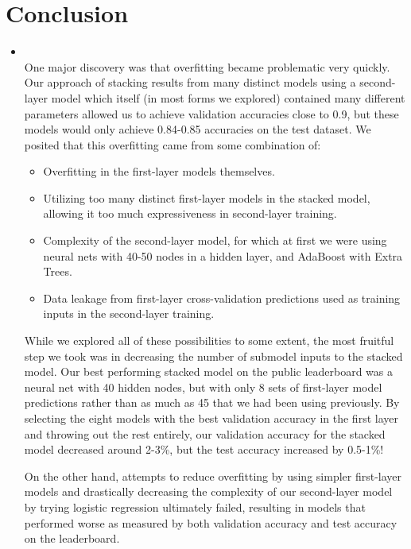 \section{Conclusion}
\medskip
\begin{itemize}

    \item {} \\
        One major discovery was that overfitting became problematic very quickly. Our approach of stacking results from many distinct models using a second-layer model which itself (in most forms we explored) contained many different parameters allowed us to achieve validation accuracies close to 0.9, but these models would only achieve 0.84-0.85 accuracies on the test dataset. We posited that this overfitting came from some combination of:
        \begin{itemize}
        \item Overfitting in the first-layer models themselves.
        \item Utilizing too many distinct first-layer models in the stacked model, allowing it too much expressiveness in second-layer training.
        \item Complexity of the second-layer model, for which at first we were using neural nets with 40-50 nodes in a hidden layer, and AdaBoost with Extra Trees.
        \item Data leakage from first-layer cross-validation predictions used as training inputs in the second-layer training.
        \end{itemize}
        While we explored all of these possibilities to some extent, the most fruitful step we took was in decreasing the number of submodel inputs to the stacked model. Our best performing stacked model on the public leaderboard was a neural net with 40 hidden nodes, but with only 8 sets of first-layer model predictions rather than as much as 45 that we had been using previously. By selecting the eight models with the best validation accuracy in the first layer and throwing out the rest entirely, our validation accuracy for the stacked model decreased around 2-3\%, but the test accuracy increased by 0.5-1\%!

        On the other hand, attempts to reduce overfitting by using simpler first-layer models and drastically decreasing the complexity of our second-layer model by trying logistic regression ultimately failed, resulting in models that performed worse as measured by both validation accuracy and test accuracy on the leaderboard.


\end{itemize}
